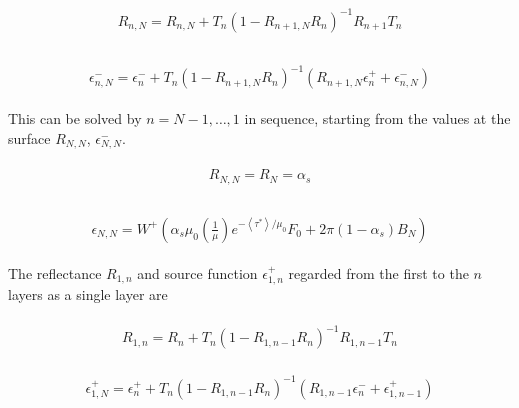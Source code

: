 \begin{eqnarray}
\begin{array}{c}
R_{n, N}=R_{n, N}+T_{n}\left(1-R_{n+1, N} R_{n}\right)^{-1} R_{n+1} T_{n} \\
\end{array}
\end{eqnarray}

\begin{eqnarray}
\begin{array}{c}
\epsilon_{n, N}^{-}=\epsilon_{n}^{-}+T_{n}\left(1-R_{n+1, N} R_{n}\right)^{-1}\left(R_{n+1, N} \epsilon_{n}^{+}+\epsilon_{n, N}^{-}\right)
\end{array}
\end{eqnarray}

This can be solved by \(n=N-1,\dots,1\) in sequence, starting from the
values at the surface \(R_{N, N}\), \(\epsilon_{N, N}^{-}\).

\begin{eqnarray}
\begin{array}{c}
R_{N, N}=R_{N}=\alpha_{s} \\
\end{array}
\end{eqnarray}

\begin{eqnarray}
\begin{array}{c}
\epsilon_{N, N}=W^{+}\left(\alpha_{s} \mu_{0}\left(\frac{1}{\mu}\right) e^{-\left\langle\tau^{*}\right\rangle / \mu_{0}} F_{0}+2 \pi\left(1-\alpha_{s}\right) B_{N}\right)
\end{array}
\end{eqnarray}

The reflectance \(R_{1, n}\) and source function \(\epsilon_{1, n}^{+}\)
regarded from the first to the \(n\) layers as a single layer are

\begin{eqnarray}
\begin{array}{c}
R_{1, n}=R_{n}+T_{n}\left(1-R_{1, n-1} R_{n}\right)^{-1} R_{1, n-1} T_{n}
\end{array}
\end{eqnarray}

\begin{eqnarray}
\begin{array}{c}
\epsilon_{1, N}^{+}=\epsilon_{n}^{+}+T_{n}\left(1-R_{1, n-1} R_{n}\right)^{-1}\left(R_{1, n-1} \epsilon_{n}^{-}+\epsilon_{1, n-1}^{+}\right)
\end{array}
\end{eqnarray}

